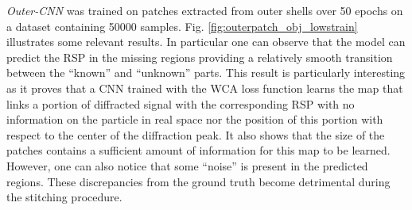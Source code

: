 \textit{Outer-CNN} was trained on patches extracted from outer shells over 50 epochs on a dataset containing 50000 samples. 
Fig. \ref{fig:outerpatch_obj_lowstrain} illustrates some relevant results. In particular one can observe that the model 
can predict the RSP in the missing regions providing a relatively smooth transition between the ``known'' and ``unknown''
parts. This result is particularly interesting as it proves that a CNN trained with the WCA loss function 
learns the map that links a portion of diffracted signal with the corresponding RSP with no information on the particle in
real space nor the position of this portion with respect to the center of the diffraction peak. It also shows that the 
size of the patches contains a sufficient amount of information for this map to be learned. 
However, one can also notice that some ``noise'' is present in the predicted regions. These discrepancies from the ground 
truth become detrimental during the stitching procedure. 



